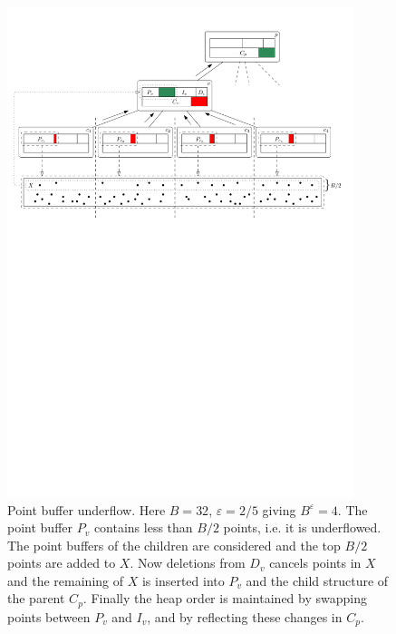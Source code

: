 \documentclass[twoside,11pt,openright]{report}
\def \epsilon {\varepsilon}
\begin{document}
\begin{enumerate}[label=(\roman*)]
	\begin{figure}[h]
		\centering
		\includegraphics[width=0.9\textwidth]{../figures/brodal_point_buffer_underflow}
		\caption{Point buffer underflow. Here $B = 32$, $\epsilon = 2/5$ giving $B^\epsilon = 4$. The point buffer $P_v$ contains less than $B/2$ points, i.e. it is underflowed. The point buffers of the children are considered and the top $B/2$ points are added to $X$. Now deletions from $D_v$ cancels points in $X$ and the remaining of $X$ is inserted into $P_v$ and the child structure of the parent $C_p$. Finally the heap order is maintained by swapping points between $P_v$ and $I_v$, and by reflecting these changes in $C_p$.}
		\label{fig:brodal_pb_underflow}
	\end{figure}
	
\end{enumerate}

\clearpage
\end{document}
